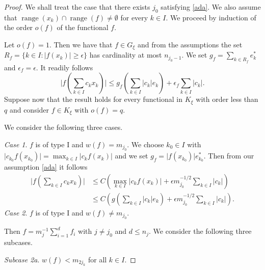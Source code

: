 \documentclass[a4paper]{amsart}
\theoremstyle{plain}
\newcommand{\e}{\epsilon}
\DeclareMathOperator{\ran}{range}
\begin{document}
\begin{proof}
We shall treat the case that there exists  $j_0$ satisfying   \eqref{ada}.
We also assume  that
$\ran(x_k)\cap\ran(f)\ne\emptyset$ for every $k\in I$.
We proceed by induction of the order $o(f)$ of the functional $f$.

Let $o(f)=1$. Then we have that $f\in G_{\xi}$ and from  the assumptions
the set
$R_{f}=\{k\in I:\vert f(x_k)\vert\geq \e\}$ has cardinality at most
$n_{j_0-1}$.
We set $g_{f}=\sum_{k\in R_{f}}e_{k}^{*}$ and $\e_{f}=\e$.
It readily follows
$$
\vert f(\sum_{k\in I}c_{k}x_{k})\vert\leq g_{f}(\sum_{k\in I}\vert c_k\vert e_{k})+\e_{f}\sum_{k\in I}\vert c_{k}\vert.
$$
Suppose now that the result holds for every functional in $K_{\xi}$ with order less than
$q$ and consider $f\in K_{\xi}$ with $o(f)= q$.


We consider the following three cases.

\textit{Case 1}. $f$ is of type I and $w(f)=m_{j_0}$.
 We choose
$k_0\in I$ with $\vert c_{k_0}f(x_{k_0})\vert=\max_{k\in I}\vert
c_kf(x_k)\vert$ and we set $g_{f}=\vert f(x_{k_0})\vert
e^{*}_{k_0}$. Then from our assumption \eqref{ada} it follows
\begin{align*}
\vert f(\sum_{k\in I}c_{k}x_{k})\vert&\leq C\left(\max_{k\in I}\vert c_kf(x_{k})\vert+\e m_{j_0}^{-1/2}\sum_{k\in I}\vert c_k\vert\right)
\\
&\leq C\left(g(\sum_{k\in I}\vert c_k\vert e_{k})+\e m_{j_0}^{-1/2}\sum_{k\in I}\vert c_k\vert\right).
\end{align*}
\textit{Case 2}. $f$ is of type I and $w(f)\ne m_{j_0}$.

Then
$
f=m_{j}^{-1}\sum_{i=1}^{d}f_{i}
$
with $j\ne j_0$  and $d\leq n_{j}$.
We consider the following three subcases.

\textit{Subcase 2a}. $w(f)<m_{2j_k}$ for all $k\in I$.


\end{proof}
\end{document}
